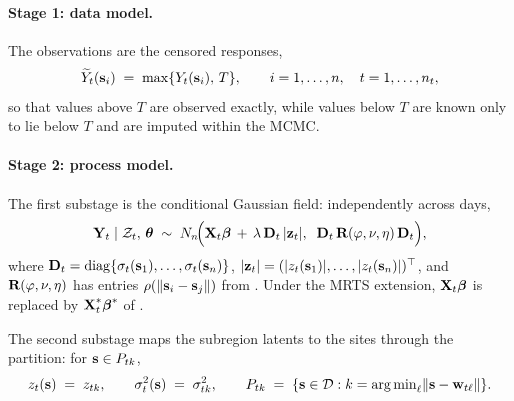 \documentclass[12pt]{article}
\begin{document}
\paragraph{Stage 1: data model.}
The observations are the censored responses,
\begin{align}
  \widetilde{Y}_t(\mbox{\bf s}_i) \;=\; \max\{Y_t(\mbox{\bf s}_i),\, T\},
  \qquad i = 1, \ldots, n,\quad t = 1, \ldots, n_t,
  \label{eq:stage1-censor}
\end{align}
so that values above $T$ are observed exactly, while values below $T$ are known
only to lie below $T$ and are imputed within the MCMC.

\paragraph{Stage 2: process model.}
The first substage is the conditional Gaussian field: independently across days,
\begin{align}
  \mbox{\bf Y}_t \mid {\cal Z}_t,\, \mbox{\boldmath $\theta$}
  \;\sim\;
  N_n\!\Big(\mbox{\bf X}_t\mbox{\boldmath $\beta$} \,+\, \lambda\, \mbox{\bf D}_t\, |\mbox{\bf z}_t|,\;\;
            \mbox{\bf D}_t\, \mbox{\bf R}(\varphi, \nu, \eta)\, \mbox{\bf D}_t\Big),
  \label{eq:bhm-data-gauss}
\end{align}
where $\mbox{\bf D}_t = \mathrm{diag}\{\sigma_t(\mbox{\bf s}_1), \ldots, \sigma_t(\mbox{\bf s}_n)\}$,
$|\mbox{\bf z}_t| = (|z_t(\mbox{\bf s}_1)|, \ldots, |z_t(\mbox{\bf s}_n)|)^\top$, and
$\mbox{\bf R}(\varphi, \nu, \eta)$ has entries $\rho(\|\mbox{\bf s}_i - \mbox{\bf s}_j\|)$ from
.  Under the MRTS extension, $\mbox{\bf X}_t\mbox{\boldmath $\beta$}$ is replaced by
$\mbox{\bf X}^*_t\mbox{\boldmath $\beta$}^*$ of .

The second substage maps the subregion latents to the sites through the
partition: for $\mbox{\bf s} \in P_{tk}$,
\begin{align}
  z_t(\mbox{\bf s}) \;=\; z_{tk},
  \qquad
  \sigma^2_t(\mbox{\bf s}) \;=\; \sigma^2_{tk},
  \qquad
  P_{tk} \;=\; \{\mbox{\bf s} \in {\cal D} : k = {\mathop{\rm arg\, min}}_\ell \|\mbox{\bf s} - \mbox{\bf w}_{t\ell}\|\}.
  \label{eq:stage2-partition}
\end{align}
\end{document}
